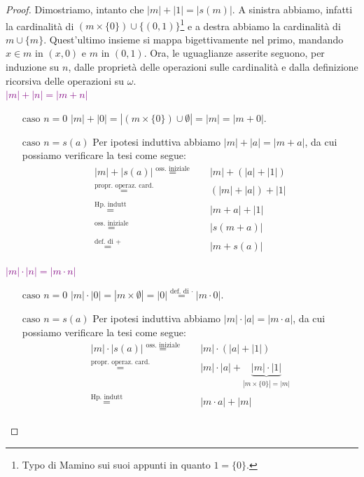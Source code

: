 \begin{proof}
	Dimostriamo, intanto che $|m| + |1| = |s(m)|$. A sinistra abbiamo, infatti la cardinalità di $(m \times \{0\}) \cup \{(0,1)\}$\footnote{Typo di Mamino sui suoi appunti in quanto $1 = \{0\}$.} e a destra abbiamo la cardinalità di $m \cup \{m\}$.
	Quest'ultimo insieme si mappa bigettivamente nel primo, mandando $x \in m$ in $(x,0)$ e $m$ in $(0,1)$. 
	Ora, le uguaglianze asserite seguono, per induzione su $n$, dalle proprietà delle operazioni sulle cardinalità e dalla definizione ricorsiva delle operazioni su $\omega$.\\
	\textcolor{purple}{$|m|+|n| = |m+n|$}
	\begin{itemize}
		\item[$\boxed{\text{caso $n = 0$}}$] $|m| + |0| =  |(m \times \{0\}) \cup \emptyset| = |m| = |m + 0|$.
		\item[$\boxed{\text{caso $n = s(a)$}}$] Per ipotesi induttiva abbiamo $|m| + |a| = |m + a|$, da cui possiamo verificare la tesi come segue:
		\begin{align*}
			|m| + |s(a)| \overset{\text{oss. iniziale}}{=}\quad& |m| + (|a| + |1|) \\
						 \overset{\text{propr. operaz. card.}}{=}& (|m| + |a|) + |1| \\
						 \overset{\text{Hp. indutt}}{=}\quad& |m+a| + |1| \\
						 \overset{\text{oss. iniziale}}{=}\quad& |s(m+a)| \\
						 \overset{\text{def. di $+$}}{=}\quad\;& |m + s(a)|
 		\end{align*}
	\end{itemize}
	\textcolor{purple}{$|m|\cdot|n| = |m \cdot n|$}
	\begin{itemize}
		\item[$\boxed{\text{caso $n = 0$}}$] $|m| \cdot |0| =  |m \times \emptyset| = |0| \overset{\text{def. di $\cdot$}}{=} |m \cdot 0|$.
		\item[$\boxed{\text{caso $n = s(a)$}}$] Per ipotesi induttiva abbiamo $|m|\cdot|a| = |m \cdot a|$, da cui possiamo verificare la tesi come segue:
		\[ \begin{split}
			|m| \cdot |s(a)| \overset{\text{oss. iniziale}}{=}\quad& |m| \cdot (|a| + |1|) \\
						 \overset{\text{propr. operaz. card.}}{=}& |m| \cdot |a| + \underbrace{|m| \cdot |1|}_{|m \times \{0\}| = |m|} \\
						 \overset{\text{Hp. indutt}}{=}\quad& |m \cdot a| + |m| \\

\end{split}\]
\end{itemize}
\end{proof}
